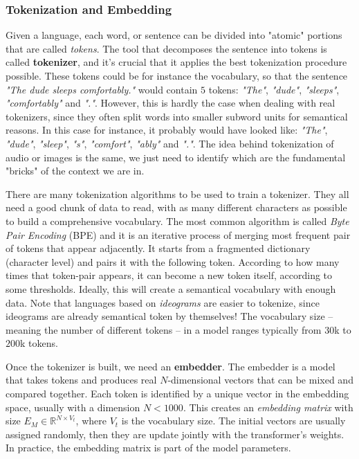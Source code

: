 \documentclass[12pt,a4paper]{article}
\begin{document}
\subsubsection*{Tokenization and Embedding}
Given a language, each word, or sentence can be divided into "atomic" portions that are called \textit{tokens}. The tool that decomposes the sentence into tokens is called \textbf{tokenizer}, and it's crucial that it applies the best tokenization procedure possible. These tokens could be for instance the vocabulary, so that the sentence \textit{"The dude sleeps comfortably."} would contain $5$ tokens: \textit{"The"}, \textit{"dude"}, \textit{"sleeps"}, \textit{"comfortably"} and \textit{"."}. However, this is hardly the case when dealing with real tokenizers, since they often split words into smaller subword units for semantical reasons. In this case for instance, it probably would have looked like: \textit{"The"}, \textit{"dude"}, \textit{"sleep"}, \textit{"s"}, \textit{"comfort"}, \textit{"ably"} and \textit{"."}. The idea behind tokenization of audio or images is the same, we just need to identify which are the fundamental "bricks" of the context we are in.

There are many tokenization algorithms to be used to train a tokenizer. They all need a good chunk of data to read, with as many different characters as possible to build a comprehensive vocabulary.
The most common algorithm is called \textit{Byte Pair Encoding} (BPE) and it is an iterative process of merging most frequent pair of tokens that appear adjacently. It starts from a fragmented dictionary (character level) and pairs it with the following token. According to how many times that token-pair appears, it can become a new token itself, according to some thresholds. Ideally, this will create a semantical vocabulary with enough data. Note that languages based on \textit{ideograms} are easier to tokenize, since ideograms are already semantical token by themselves!
The vocabulary size -- meaning the number of different tokens -- in a model ranges typically from $30$k to $200$k tokens.

Once the tokenizer is built, we need an \textbf{embedder}. The embedder is a model that takes tokens and produces real $N$-dimensional vectors that can be mixed and compared together.
Each token is identified by a unique vector in the embedding space, usually with a dimension $N<1000$. This creates an \textit{embedding matrix} with size $E_M \in \mathbb{R}^{N \times V_t}$, where $V_t$ is the vocabulary size. The initial vectors are usually assigned randomly, then they are update jointly with the transformer's weights. In practice, the embedding matrix is part of the model parameters.
\end{document}
